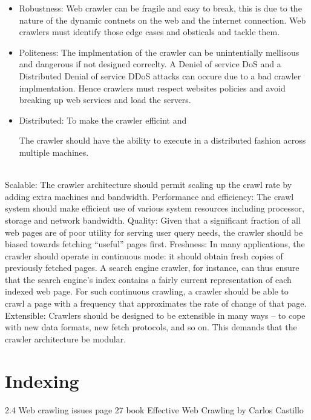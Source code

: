 \begin{itemize}
  \item Robustness: Web crawler can be fragile and easy to break, this is due to the nature of the dynamic contnets on the web and the internet connection. Web crawlers must identify those edge cases and obsticals and tackle them.  
  \item Politeness: The implmentation of the crawler can be unintentially mellisous and dangerous if not designed correclty. A Deniel of service DoS and a Distributed Denial of service DDoS attacks can occure due to a bad crawler implmentation. Hence crawlers must respect websites policies and avoid breaking up web services and load the servers.

\item Distributed: To make the crawler efficint and 

The crawler should have the ability to execute in a distributed
fashion across multiple machines.
\end{itemize}


\\



Scalable: The crawler architecture should permit scaling up the crawl rate
by adding extra machines and bandwidth.
Performance and efficiency: The crawl system should make efficient use of
various system resources including processor, storage and network bandwidth.
Quality: Given that a significant fraction of all web pages are of poor utility for serving user query needs, the crawler should be biased towards
fetching “useful” pages first.
Freshness: In many applications, the crawler should operate in continuous
mode: it should obtain fresh copies of previously fetched pages. A search
engine crawler, for instance, can thus ensure that the search engine’s index
contains a fairly current representation of each indexed web page. For
such continuous crawling, a crawler should be able to crawl a page with
a frequency that approximates the rate of change of that page.
Extensible: Crawlers should be designed to be extensible in many ways –
to cope with new data formats, new fetch protocols, and so on. This demands that the crawler architecture be modular.

\section{Indexing}
2.4 Web crawling issues page 27 book Effective Web Crawling by Carlos Castillo